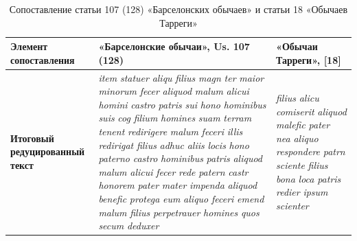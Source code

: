 \begin{center}
\small
\setlength{\tabcolsep}{2pt}
\begin{longtable}{|p{}|p{}|p{}|}
\caption{Сопоставление статьи 107 (128) «Барселонских обычаев» и статьи 18 «Обычаев Тарреги»}\label{tab:ch1-tarrega}\\
\hline
\textbf{Элемент сопоставления} & \textbf{«Барселонские обычаи», }\textbf{Us}\textbf{. }\textbf{107 (}\textbf{128}\textbf{)} & \textbf{«Обычаи Тарреги», }\textbf{[}\textbf{18}\textbf{]} \\ \hline
\textbf{Итоговый редуцированный текст} & \emph{item}\emph{ }\emph{statuer}\emph{ }\emph{aliqu}\emph{ }\emph{filius}\emph{ }\emph{magn}\emph{ }\emph{ter}\emph{ }\emph{maior}\emph{ }\emph{minorum}\emph{ }\emph{fecer}\emph{ }\emph{aliquod}\emph{ }\emph{malum}\emph{ }\emph{alicui}\emph{ }\emph{homini}\emph{ }\emph{castro}\emph{ }\emph{patris}\emph{ }\emph{sui}\emph{ }\emph{hono}\emph{ }\emph{hominibus}\emph{ }\emph{suis}\emph{ }\emph{cog}\emph{ }\emph{filium}\emph{ }\emph{homines}\emph{ }\emph{suam}\emph{ }\emph{terram}\emph{ }\emph{tenent}\emph{ }\emph{redirigere}\emph{ }\emph{malum}\emph{ }\emph{feceri}\emph{ }\emph{illis}\emph{ }\emph{redirigat}\emph{ }\emph{filius}\emph{ }\emph{adhuc}\emph{ }\emph{aliis}\emph{ }\emph{locis}\emph{ }\emph{hono}\emph{ }\emph{paterno}\emph{ }\emph{castro}\emph{ }\emph{hominibus}\emph{ }\emph{patris}\emph{ }\emph{aliquod}\emph{ }\emph{malum}\emph{ }\emph{alicui}\emph{ }\emph{fecer}\emph{ }\emph{rede}\emph{ }\emph{patern}\emph{ }\emph{castr}\emph{ }\emph{honorem}\emph{ }\emph{pater}\emph{ }\emph{mater}\emph{ }\emph{impenda}\emph{ }\emph{aliquod}\emph{ }\emph{benefic}\emph{ }\emph{protega}\emph{ }\emph{eum}\emph{ }\emph{aliquo}\emph{ }\emph{feceri}\emph{ }\emph{emend}\emph{ }\emph{malum}\emph{ }\emph{filius}\emph{ }\emph{perpetrauer}\emph{ }\emph{homines}\emph{ }\emph{quos}\emph{ }\emph{secum}\emph{ }\emph{deduxer} & \emph{filius}\emph{ }\emph{alicu}\emph{ }\emph{comiserit}\emph{ }\emph{aliquod}\emph{ }\emph{malefic}\emph{ }\emph{pater}\emph{ }\emph{nea}\emph{ }\emph{aliquo}\emph{ }\emph{respondere}\emph{ }\emph{patrn}\emph{ }\emph{sciente}\emph{ }\emph{filius}\emph{ }\emph{bona}\emph{ }\emph{loca}\emph{ }\emph{patris}\emph{ }\emph{redier}\emph{ }\emph{ipsum}\emph{ }\emph{scienter} \\ \hline

\end{longtable}
\end{center}
